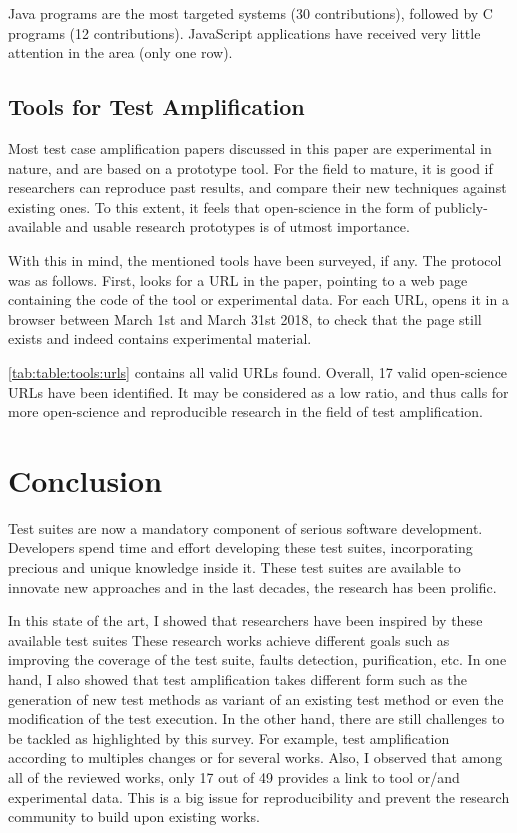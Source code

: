 Java programs are the most targeted systems (30 contributions), followed by C programs (12 contributions). 
JavaScript applications have received very little attention in the area (only one row).

\subsection{Tools for Test Amplification}
\label{subsec:sota:analysis:tools}



Most test case amplification papers discussed in this paper are experimental in nature, and are based on a prototype tool. 
For the field to mature, it is good if researchers can reproduce past results, and compare their new techniques against existing ones.
To this extent, it feels that open-science in the form of publicly-available and usable research prototypes is of utmost importance. 

With this in mind, the mentioned tools have been surveyed, if any. 
The protocol was as follows. 
First, looks for a URL in the paper, pointing to a web page containing the code of the tool or experimental data.  
For each URL, opens it in a browser between March 1st and March 31st 2018, to check that the page still exists and indeed contains experimental material.

\autoref{tab:table:tools:urls} contains all valid URLs found. 
Overall, 17 valid open-science URLs have been identified. 
It may be considered as a low ratio, and thus calls for more open-science and reproducible research in the field of test amplification.

\section{Conclusion}
\label{sec:sota:conclusion}

Test suites are now a mandatory component of serious software development.
Developers spend time and effort developing these test suites, incorporating precious and unique knowledge inside it.
These test suites are available to innovate new approaches and in the last decades, the research has been prolific.

In this state of the art, I showed that researchers have been inspired by these available test suites
These research works achieve different goals such as improving the coverage of the test suite, faults detection, purification, etc.
In one hand, I also showed that test amplification takes different form such as the generation of new test methods as variant of an existing test method or even the modification of the test execution.
In the other hand, there are still challenges to be tackled as highlighted by this survey.
For example, test amplification according to multiples changes or for several works.
Also, I observed that among all of the reviewed works, only 17 out of 49 provides a link to tool or/and experimental data.
This is a big issue for reproducibility and prevent the research community to build upon existing works.


